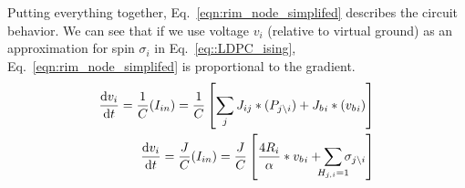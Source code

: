 Putting everything together, 
Eq.~\ref{eqn:rim_node_simplifed} describes the circuit behavior.
We can see that if we use voltage $v_i$ (relative to virtual ground) 
as an approximation for spin $\sigma_i$ in Eq.~\ref{eq::LDPC_ising}, 
Eq.~\ref{eqn:rim_node_simplifed} is proportional to the gradient.
\begin{equation}\label{eqn:rim_node_simplifed}
\begin{split}
    \dv{v_i}{t} = \frac{1}{C}(I_{in}) =  \frac{1}{C} \left[ \sum_{\mathclap{j}} J_{ij}*(P_{j\backslash i}) + {J_b}_i*({v_b}_i) \right] \\
    \dv{v_i}{t} = \frac{J}{C}(I_{in}) =  \frac{J}{C} \left[ \frac{4R_i}{\alpha}*{v_b}_i  + 
    \sum_{\mathclap{H_{j,i}=1}} \sigma_{j\backslash i} \right]
\end{split}
\end{equation}

